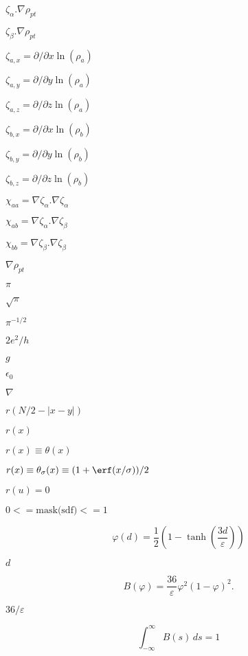\documentclass{article}
\begin{document}
$ \zeta_{\alpha}.\nabla\rho_{pt} $
\pagebreak

$ \zeta_{\beta}.\nabla\rho_{pt} $
\pagebreak

$ \zeta_{a,x}=\partial/{\partial x} \ln(\rho_a)  $
\pagebreak

$ \zeta_{a,y}=\partial/{\partial y} \ln(\rho_a)  $
\pagebreak

$ \zeta_{a,z}=\partial/{\partial z} \ln(\rho_a)  $
\pagebreak

$ \zeta_{b,x} = \partial/{\partial x} \ln(\rho_b)  $
\pagebreak

$ \zeta_{b,y} = \partial/{\partial y} \ln(\rho_b)  $
\pagebreak

$ \zeta_{b,z} = \partial/{\partial z} \ln(\rho_b)  $
\pagebreak

$ \chi_{aa} = \nabla \zeta_{\alpha}.\nabla \zeta_{\alpha} $
\pagebreak

$ \chi_{ab} = \nabla \zeta_{\alpha}.\nabla \zeta_{\beta} $
\pagebreak

$ \chi_{bb} = \nabla \zeta_{\beta}.\nabla \zeta_{\beta} $
\pagebreak

$ \nabla\rho_{pt}$
\pagebreak

$\pi$
\pagebreak

$\sqrt{\pi}$
\pagebreak

$\pi^{-1/2}$
\pagebreak

$ 2e^2/h $
\pagebreak

$ g $
\pagebreak

$\epsilon_0$
\pagebreak

$ \nabla $
\pagebreak

$ r(N/2 - |x-y|) $
\pagebreak

$ r(x) $
\pagebreak

$ r(x) \equiv \theta(x)$
\pagebreak

$ r(x) \equiv \theta_\sigma(x) \equiv (1 + \erf(x/\sigma))/2 $
\pagebreak

$r(u) = 0$
\pagebreak

$0 <=  \mbox{mask(sdf)} <= 1$
\pagebreak

\[ \varphi(d) = \frac{1}{2}\left( 1 - \tanh\left(
                 \frac{3d}{\varepsilon} \right) \right) \]
\pagebreak

$d$
\pagebreak

\[ B(\varphi) = \frac{36}{\varepsilon} \varphi^2 (1-\varphi)^2. \]
\pagebreak

$36/\varepsilon$
\pagebreak

\[ \int_{-\infty}^\infty B(s) \, ds = 1 \]
\pagebreak
\end{document}
